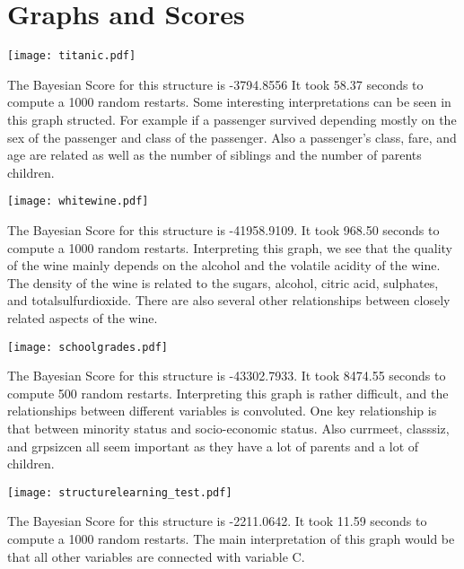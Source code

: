 \documentclass[12pt, oneside]{article}
\begin{document}
\section{Graphs and Scores}
  \begin{center}
    \texttt{[image: titanic.pdf]}
  \end{center}
  The Bayesian Score for this structure is -3794.8556
  It took 58.37 seconds to compute a 1000 random restarts.
  Some interesting interpretations can be seen in this graph structed.
  For example if a passenger survived depending mostly on the sex of the
  passenger and class of the passenger.
  Also a passenger's class, fare, and age are related as well as the number
  of siblings and the number of parents children.
  \begin{center}
    \texttt{[image: whitewine.pdf]}
  \end{center}
  The Bayesian Score for this structure is -41958.9109.
  It took 968.50 seconds to compute a 1000 random restarts.
  Interpreting this graph, we see that the quality of the wine mainly depends
  on the alcohol and the volatile acidity of the wine.
  The density of the wine is related to the sugars, alcohol, citric acid,
  sulphates, and totalsulfurdioxide.
  There are also several other relationships between closely related aspects of
  the wine.
  \begin{center}
    \texttt{[image: schoolgrades.pdf]}
  \end{center}
  The Bayesian Score for this structure is -43302.7933.
  It took 8474.55 seconds to compute 500 random restarts.
  Interpreting this graph is rather difficult, and the relationships between
  different variables is convoluted.
  One key relationship is that between minority status and socio-economic status.
  Also currmeet, classsiz, and grpsizcen all seem important as they have a lot of
  parents and a lot of children.
  \begin{center}
    \texttt{[image: structurelearning\_test.pdf]}
  \end{center}
  The Bayesian Score for this structure is -2211.0642.
  It took 11.59 seconds to compute a 1000 random restarts.
  The main interpretation of this graph would be that all other variables are
  connected with variable C.

  
  
\end{document}
